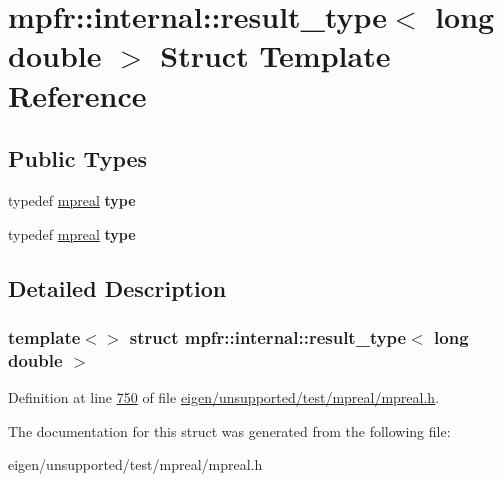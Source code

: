 \hypertarget{structmpfr_1_1internal_1_1result__type_3_01long_01double_01_4}{}\section{mpfr\+:\+:internal\+:\+:result\+\_\+type$<$ long double $>$ Struct Template Reference}
\label{structmpfr_1_1internal_1_1result__type_3_01long_01double_01_4}
\subsection*{Public Types}
\begin{DoxyCompactItemize}
\item 
\mbox{\label{structmpfr_1_1internal_1_1result__type_3_01long_01double_01_4_a88bb132cd63db1927fec9ba6d3b40d18}} 
typedef \hyperlink{classmpfr_1_1mpreal}{mpreal} {\bfseries type}
\item 
\mbox{\label{structmpfr_1_1internal_1_1result__type_3_01long_01double_01_4_a88bb132cd63db1927fec9ba6d3b40d18}} 
typedef \hyperlink{classmpfr_1_1mpreal}{mpreal} {\bfseries type}
\end{DoxyCompactItemize}


\subsection{Detailed Description}
\subsubsection*{template$<$$>$\newline
struct mpfr\+::internal\+::result\+\_\+type$<$ long double $>$}



Definition at line \hyperlink{eigen_2unsupported_2test_2mpreal_2mpreal_8h_source_l00750}{750} of file \hyperlink{eigen_2unsupported_2test_2mpreal_2mpreal_8h_source}{eigen/unsupported/test/mpreal/mpreal.\+h}.



The documentation for this struct was generated from the following file\+:\begin{DoxyCompactItemize}
\item 
eigen/unsupported/test/mpreal/mpreal.\+h\end{DoxyCompactItemize}
